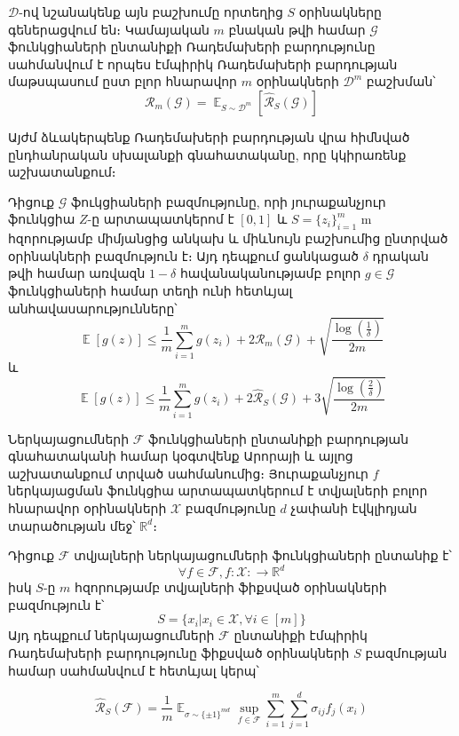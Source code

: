 \documentclass[12pt]{article}
\DeclareMathOperator*{\E}{\mathbb{E}}
\begin{document}
\begin{defination}
$\mathcal{D}$-ով նշանակենք այն բաշխումը որտեղից $S$ օրինակները գեներացվում են։ Կամայական $m$ բնական թվի համար $\mathcal{G}$ ֆունկցիաների ընտանիքի Ռադեմախերի բարդությունը սահմանվում է որպես էմպիրիկ Ռադեմախերի բարդության մաթսպասում ըստ բլոր հնարավոր $m$ օրինակների $\mathcal{D}^m$ բաշխման՝
$$\mathcal{R}_m(\mathcal{G}) = \E_{S \sim \mathcal{D}^m} \left [     \hat{\mathcal{R}}_S(\mathcal{G})  \right] $$
\end{defination}
Այժմ ձևակերպենք Ռադեմախերի բարդության վրա հիմնված ընդհանրական սխալանքի գնահատականը, որը կկիրառենք աշխատանքում։ 
\begin{theorem}
\label{rad_comp_th}
Դիցուք $\mathcal{G}$ ֆուկցիաների բազմությունը, որի յուրաքանչյուր ֆունկցիա  $Z$-ը արտապատկերոմ է $[0, 1]$ և $S = \{z_i\}_{i=1}^m$ m հզորությամբ միմյանցից անկախ և միևնույն բաշխումից ընտրված օրինակների բազմություն է։ Այդ դեպքում ցանկացած $\delta$ դրական թվի համար առվազն $1 - \delta$ հավանականությամբ բոլոր $g \in \mathcal{G}$ ֆունկցիաների համար տեղի ունի հետևյալ անհավասարությունները՝
\begin{equation}
\E[g(z)] \leq \frac{1}{m}\sum_{i=1}^mg(z_i) + 2\mathcal{R}_m(\mathcal{G}) + \sqrt{\frac{\log\left( \frac{1}{\delta} \right)}{2m}}
\end{equation}
և
\begin{equation}
\E[g(z)] \leq \frac{1}{m}\sum_{i=1}^mg(z_i) + 2\hat{\mathcal{R}}_S(\mathcal{G}) + 3\sqrt{\frac{\log \left( \frac{2}{\delta} \right)}{2m}}
\end{equation}
\end{theorem}


Ներկայացումների $\mathcal{F}$ ֆունկցիաների ընտանիքի բարդության գնահատականի համար կօգտվենք Արորայի և այլոց աշխատանքում տրված սահմանումից։ Յուրաքանչյուր $f$ ներկայացման ֆունկցիա արտապատկերում է տվյալների բոլոր հնարավոր օրինակների $\mathcal{X}$ բազմությունը $d$ չափանի էվկլիդյան տարածության մեջ՝ $\mathbb{R}^d$։

\begin{defination} Դիցուք $\mathcal{F}$ տվյալների ներկայացումների ֆունկցիաների ընտանիք է՝ $$\forall f \in \mathcal{F}, f:\mathcal{X}: \rightarrow \mathbb{R}^d$$
իսկ $S$-ը $m$ հզորությամբ տվյալների ֆիքսված օրինակների բազմություն է՝
$$S = \{x_i | x_i \in \mathcal{X}, \forall i \in [m]\}$$
Այդ դեպքում ներկայացումների $\mathcal{F}$ ընտանիքի էմպիրիկ Ռադեմախերի բարդությունը ֆիքսված օրինակների $S$ բազմության համար սահմանվում է հետևյալ կերպ՝

$$\hat{\mathcal{R}}_S(\mathcal{F}) = \frac{1}{m} \E_{\sigma \sim \{\pm 1\}^{md}} \sup_{f\in \mathcal{F}} \sum_{i = 1}^m \sum_{j = 1}^d \sigma_{ij} f_j(x_i) $$

\end{defination}
\end{document}
